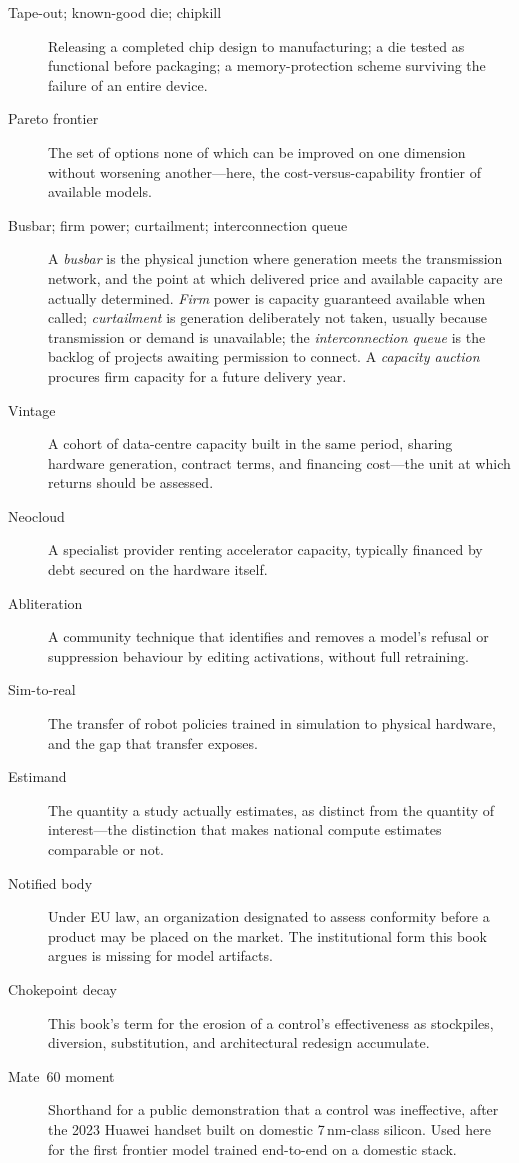\begin{description}
  \item[Tape-out; known-good die; chipkill] Releasing a completed chip design to manufacturing; a die tested as functional before packaging; a memory-protection scheme surviving the failure of an entire device.
  \item[Pareto frontier] The set of options none of which can be improved on one dimension without worsening another---here, the cost-versus-capability frontier of available models.
  \item[Busbar; firm power; curtailment; interconnection queue] A \emph{busbar} is the physical junction where generation meets the transmission network, and the point at which delivered price and available capacity are actually determined. \emph{Firm} power is capacity guaranteed available when called; \emph{curtailment} is generation deliberately not taken, usually because transmission or demand is unavailable; the \emph{interconnection queue} is the backlog of projects awaiting permission to connect. A \emph{capacity auction} procures firm capacity for a future delivery year.
  \item[Vintage] A cohort of data-centre capacity built in the same period, sharing hardware generation, contract terms, and financing cost---the unit at which returns should be assessed.
  \item[Neocloud] A specialist provider renting accelerator capacity, typically financed by debt secured on the hardware itself.
  \item[Abliteration] A community technique that identifies and removes a model's refusal or suppression behaviour by editing activations, without full retraining.
  \item[Sim-to-real] The transfer of robot policies trained in simulation to physical hardware, and the gap that transfer exposes.
  \item[Estimand] The quantity a study actually estimates, as distinct from the quantity of interest---the distinction that makes national compute estimates comparable or not.
  \item[Notified body] Under EU law, an organization designated to assess conformity before a product may be placed on the market. The institutional form this book argues is missing for model artifacts.
  \item[Chokepoint decay] This book's term for the erosion of a control's effectiveness as stockpiles, diversion, substitution, and architectural redesign accumulate.
  \item[Mate~60 moment] Shorthand for a public demonstration that a control was ineffective, after the 2023 Huawei handset built on domestic 7\,nm-class silicon. Used here for the first frontier model trained end-to-end on a domestic stack.
\end{description}
